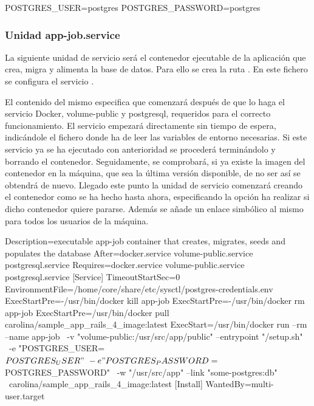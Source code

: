 \begin{codelisting}
\label{code:credentials}
\begin{code}
POSTGRES_USER=postgres
POSTGRES_PASSWORD=postgres
\end{code}
\end{codelisting}

\subsubsection{Unidad app-job.service}

La siguiente unidad de servicio será el contenedor ejecutable de la aplicación que crea, migra y alimenta la base de datos. Para ello se crea la ruta . En este fichero se configura el servicio .

El contenido del mismo especifica que comenzará después de que lo haga el servicio Docker, volume-public y postgresql, requeridos para el correcto funcionamiento. El servicio empezará directamente sin tiempo de espera, indicándole el fichero donde ha de leer las variables de entorno necesarias. Si este servicio ya se ha ejecutado con anterioridad se procederá terminándolo y borrando el contenedor. Seguidamente, se comprobará, si ya existe la imagen del contenedor en la máquina, que sea la última versión disponible, de no ser así se obtendrá de nuevo. Llegado este punto la unidad de servicio comenzará creando el contenedor como se ha hecho hasta ahora, especificando la opción ha realizar si dicho contenedor quiere pararse. Además se añade un enlace simbólico al mismo para todos los usuarios de la máquina. 

\begin{codelisting}
\label{code:app-job.service}
\begin{code}
[Unit] 
  Description=executable app-job container that creates, migrates, seeds and 
              populates the database
  After=docker.service volume-public.service postgresql.service
  Requires=docker.service volume-public.service postgresql.service
[Service] 
  TimeoutStartSec=0 
  EnvironmentFile=/home/core/share/etc/sysctl/postgres-credentials.env
  ExecStartPre=-/usr/bin/docker kill app-job 
  ExecStartPre=-/usr/bin/docker rm app-job 
  ExecStartPre=/usr/bin/docker pull carolina/sample_app_rails_4_image:latest 
  ExecStart=/usr/bin/docker run --rm --name app-job \
  -v "volume-public:/usr/src/app/public" --entrypoint "/setup.sh" \
  -e "POSTGRES_USER=${POSTGRES_USER}" \
  -e "POSTGRES_PASSWORD=${POSTGRES_PASSWORD}" \
  -w "/usr/src/app" --link "some-postgres:db" \
  carolina/sample_app_rails_4_image:latest
[Install] 
  WantedBy=multi-user.target
\end{code}
\end{codelisting}


